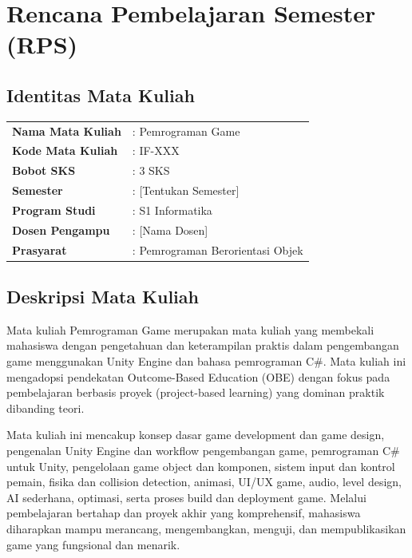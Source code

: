 
\chapter{Rencana Pembelajaran Semester (RPS)}

\section{Identitas Mata Kuliah}

\begin{table}[h]
\centering
\begin{tabular}{ll}
\textbf{Nama Mata Kuliah} & : Pemrograman Game \\
\textbf{Kode Mata Kuliah} & : IF-XXX \\
\textbf{Bobot SKS} & : 3 SKS \\
\textbf{Semester} & : [Tentukan Semester] \\
\textbf{Program Studi} & : S1 Informatika \\
\textbf{Dosen Pengampu} & : [Nama Dosen] \\
\textbf{Prasyarat} & : Pemrograman Berorientasi Objek \\
\end{tabular}
\end{table}

\section{Deskripsi Mata Kuliah}

Mata kuliah Pemrograman Game merupakan mata kuliah yang membekali mahasiswa dengan pengetahuan dan keterampilan praktis dalam pengembangan game menggunakan Unity Engine dan bahasa pemrograman C\#. Mata kuliah ini mengadopsi pendekatan Outcome-Based Education (OBE) dengan fokus pada pembelajaran berbasis proyek (project-based learning) yang dominan praktik dibanding teori.

Mata kuliah ini mencakup konsep dasar game development dan game design, pengenalan Unity Engine dan workflow pengembangan game, pemrograman C\# untuk Unity, pengelolaan game object dan komponen, sistem input dan kontrol pemain, fisika dan collision detection, animasi, UI/UX game, audio, level design, AI sederhana, optimasi, serta proses build dan deployment game. Melalui pembelajaran bertahap dan proyek akhir yang komprehensif, mahasiswa diharapkan mampu merancang, mengembangkan, menguji, dan mempublikasikan game yang fungsional dan menarik.

